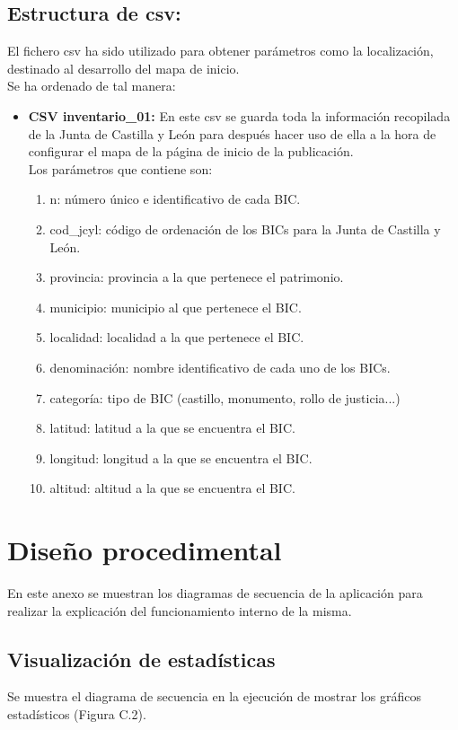\subsection{Estructura de csv:}
El fichero csv ha sido utilizado para obtener parámetros como la localización, destinado al desarrollo del mapa de inicio. \\
Se ha ordenado de tal manera:
\begin{itemize}
   
    \item \textbf{CSV inventario\_01:}  
    En este csv se guarda toda la información recopilada de la Junta de Castilla y León para después hacer uso de ella a la hora de configurar el mapa de la página de inicio de la publicación.\\
    Los parámetros que contiene son: 
    \begin{enumerate}
        \item n: número único e identificativo de cada BIC.
        \item cod\_jcyl: código de ordenación de los BICs para la Junta de Castilla y León.
        \item provincia: provincia a la que pertenece el patrimonio.
        \item municipio: municipio al que pertenece el BIC.
        \item localidad: localidad a la que pertenece el BIC.
        \item denominación: nombre identificativo de cada uno de los BICs.  
        \item categoría: tipo de BIC (castillo, monumento, rollo de justicia...)
        \item latitud: latitud a la que se encuentra el BIC.
        \item longitud: longitud a la que se encuentra el BIC.
        \item altitud: altitud a la que se encuentra el BIC.
    \end{enumerate}
      
\end{itemize}

\section{Diseño procedimental}
En este anexo se muestran los diagramas de secuencia de la aplicación para realizar la explicación del funcionamiento interno de la misma.
\subsection{Visualización de estadísticas}
Se muestra el diagrama de secuencia en la ejecución de mostrar los gráficos estadísticos (Figura C.2).\\

